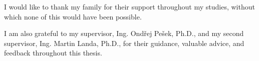 \begin{acknowledgements}
\vspace{0.4cm}
I would like to thank my family for their support throughout my studies, without which none of this would have been possible.

I am also grateful to my supervisor, Ing. Ondřej Pešek, Ph.D., and my second supervisor, Ing. Martin Landa, Ph.D., for their guidance, valuable advice, and feedback throughout this thesis.
\end{acknowledgements}
\clearpage